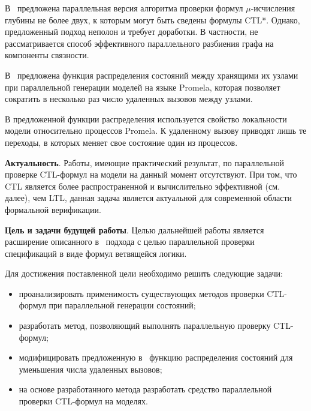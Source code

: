 \documentclass[a4paper,notitlepage,14pt]{article}
\begin{document}
В~\cite{Leucker_parallelmodel} предложена параллельная версия алгоритма проверки формул
$\mu$-исчисления глубины не более двух, к которым могут быть сведены формулы CTL*. Однако,
предложенный подход неполон и требует доработки. В частности, не рассматривается способ
эффективного параллельного разбиения графа на компоненты связности.

В~\cite{Korotkov10Miem} предложена функция распределения состояний между хранящими их
узлами при параллельной генерации моделей на языке Promela, которая позволяет сократить в
несколько раз число удаленных вызовов между узлами.

В предложенной функции распределения используется свойство локальности модели относительно
процессов Promela. К удаленному вызову приводят лишь те переходы, в которых меняет свое
состояние один из процессов.


\textbf{Актуальность}. Работы, имеющие практический результат, по параллельной проверке
CTL-формул на модели на данный момент отсутствуют. При том, что CTL является более
распространенной и вычислительно эффективной (см. далее), чем LTL, данная задача является
актуальной для современной области формальной верификации.


\textbf{Цель и задачи будущей работы}. Целью дальнейшей работы является расширение
описанного в~\cite{Korotkov10Miem} подхода с целью параллельной проверки спецификаций в
виде формул ветвящейся логики.

Для достижения поставленной цели необходимо решить следующие задачи:

\begin{itemize}
\item проанализировать применимость существующих методов проверки CTL-формул при
  параллельной генерации состояний;
\item разработать метод, позволяющий выполнять параллельную проверку CTL-формул;
\item модифицировать предложенную в~\cite{Korotkov10Miem} функцию распределения состояний
  для уменьшения числа удаленных вызовов;
\item на основе разработанного метода разработать средство параллельной проверки
  CTL-формул на моделях.
\end{itemize}
\end{document}
